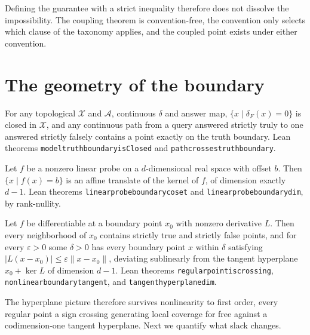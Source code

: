 \documentclass[mlmain,onecolumn]{jmlr}
\newcommand{\X}{\mathcal{X}}
\newcommand{\A}{\mathcal{A}}
\newcommand{\dF}{\delta_{\!F}}
\newcommand{\leanid}[1]{{\def\_{\textunderscore\allowbreak}\texttt{#1}}}
\begin{document}
Defining the guarantee with a strict inequality therefore does not
dissolve the impossibility. The coupling theorem is convention-free,
the convention only selects which clause of the taxonomy applies,
and the coupled point exists under either convention.

\section{The geometry of the boundary}
\label{sec:geometry}

\begin{theorem}
\label{thm:closed}
For any topological $\X$ and $\A$, continuous $\delta$ and answer
map, $\{x \mid \dF(x) = 0\}$ is closed in $\X$, and any continuous
path from a query answered strictly truly to one answered strictly
falsely contains a point exactly on the truth boundary. Lean
theorems \leanid{model\_truth\_boundary\_isClosed} and
\leanid{path\_crosses\_truth\_boundary}.
\end{theorem}

\begin{theorem}
\label{thm:hyperplane}
Let $f$ be a nonzero linear probe on a $d$-dimensional real space
with offset $b$. Then $\{x \mid f(x) = b\}$ is an affine translate
of the kernel of $f$, of dimension exactly $d - 1$. Lean theorems
\leanid{linear\_probe\_boundary\_coset} and
\leanid{linear\_probe\_boundary\_dim}, by rank-nullity.
\end{theorem}

\begin{theorem}
\label{thm:nonlinear}
Let $f$ be differentiable at a boundary point $x_0$ with nonzero
derivative $L$. Then every neighborhood of $x_0$ contains strictly
true and strictly false points, and for every $\varepsilon > 0$
some $\delta > 0$ has every boundary point $x$ within $\delta$
satisfying $|L(x - x_0)| \le \varepsilon \|x - x_0\|$, deviating
sublinearly from the tangent hyperplane $x_0 + \ker L$ of dimension
$d - 1$. Lean theorems \leanid{regular\_point\_is\_crossing},
\leanid{nonlinear\_boundary\_tangent}, and
\leanid{tangent\_hyperplane\_dim}.
\end{theorem}

The hyperplane picture therefore survives nonlinearity to first
order, every regular point a sign crossing generating local coverage
for free against a codimension-one tangent hyperplane. Next we
quantify what slack changes.
\end{document}
